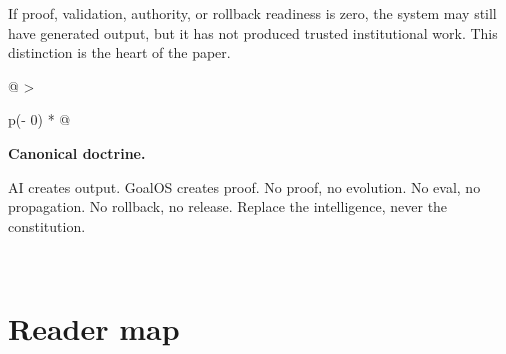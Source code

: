If proof, validation, authority, or rollback readiness is zero, the
system may still have generated output, but it has not produced trusted
institutional work. This distinction is the heart of the paper.

\begin{longtable}[]{@{}
  >{\raggedright\arraybackslash}p{(\columnwidth - 0\tabcolsep) * }@{}}
\toprule\noalign{}
\begin{minipage}[b]{\linewidth}\raggedright
\textbf{Canonical doctrine.}

AI creates output. GoalOS creates proof. No proof, no evolution. No
eval, no propagation. No rollback, no release. Replace the intelligence,
never the constitution.
\end{minipage} \\
\midrule\noalign{}
\endhead
\bottomrule\noalign{}
\endlastfoot
\end{longtable}

\section{Reader map}\label{reader-map}

